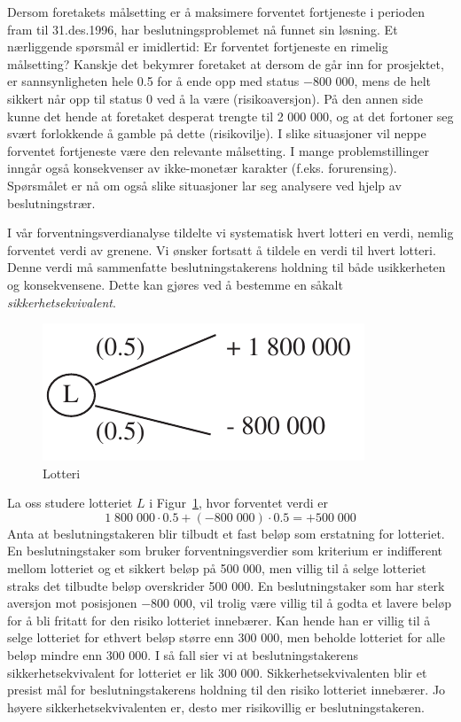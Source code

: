 {{Dersom foretakets målsetting er å maksimere forventet fortjeneste
i perioden fram til 31.des.1996, har beslutningsproblemet nå funnet
sin løsning.  Et nærliggende spørsmål er imidlertid:
Er forventet fortjeneste en rimelig målsetting?  Kanskje det bekymrer
foretaket at dersom de går inn for prosjektet, er sannsynligheten
hele 0.5 for å ende opp med status $-$800 000, mens de helt sikkert 
når opp til status 0 ved å la være (risikoaversjon).  På
den annen side kunne det hende at foretaket desperat trengte til 2 000 000,
og at det fortoner seg svært forlokkende å gamble på dette
(risikovilje).  I slike situasjoner vil neppe forventet fortjeneste 
være den rele\-vante målsetting.  I mange problemstillinger inngår
også konsekvenser av ikke-monetær karakter (f.eks. forurensing).
Spørsmålet er nå om også slike situasjoner lar seg 
analysere ved hjelp av beslutningstrær.

I vår forventningsverdianalyse tildelte vi systematisk hvert lotteri
en verdi, nemlig forventet verdi av grenene.  Vi ønsker fortsatt å
tildele en verdi til hvert lotteri.  Denne verdi må sammenfatte 
beslutningstakerens holdning til både usikkerheten og konsekvensene.
Dette kan gjøres ved å bestemme en såkalt 
{\em sikkerhetsekvivalent}.  

\begin{figure}[ht]
\centering
	\includegraphics[scale=1.0]{figurer/fig16_6.pdf} 
\caption{Lotteri}
	\label{fig:lotteri2}
\end{figure}
\noindent La oss studere lotteriet $L$ i Figur~\ref{fig:lotteri2}, hvor forventet verdi er 
\[   1\;800\;000 \cdot 0.5 +(-800\;000)\cdot 0.5 = +500\;000    \]
Anta at beslutningstakeren blir tilbudt et fast beløp som erstatning
for lotteriet.  En beslutningstaker som bruker forventningsverdier
som kriterium er indifferent mellom lotteriet og et sikkert 
beløp på 500 000, men villig til å selge lotteriet straks
det tilbudte beløp overskrider 500 000.  En beslutningstaker som har 
sterk aversjon mot posisjonen $-$800 000, vil trolig være villig til å
godta et lavere beløp for å bli fritatt for den risiko lotteriet
innebærer.  Kan hende han er villig til å selge lotteriet for 
ethvert beløp større enn 300 000, men beholde lotteriet for alle beløp
mindre enn 300 000.  I så fall sier vi at beslutningstakerens 
sikkerhetsekvivalent for lotteriet er lik 300 000.  Sikkerhetsekvivalenten
blir et presist mål for beslutningstakerens holdning til den risiko
lotteriet innebærer.  Jo høyere sikkerhetsekvivalenten er, desto
mer risikovillig er beslutningstakeren.

}}
